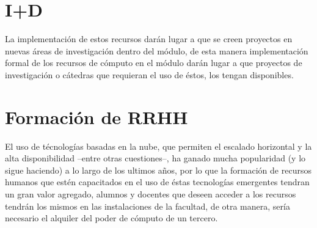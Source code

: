 \documentclass{article}
\begin{document}
\section{I+D}%
\label{sec:i_d}
La implementación de estos recursos darán lugar a que se creen proyectos en nuevas áreas de investigación
dentro del módulo, de esta manera implementación formal de los recursos de cómputo en el módulo darán lugar
a que proyectos de investigación o cátedras que requieran el uso de éstos,
los tengan disponibles.




\section{Formación de RRHH}%
\label{sec:formacion_de_rrhh}
El uso de técnologías basadas en la nube, que permiten el escalado horizontal y
la alta disponibilidad --entre otras cuestiones--, ha ganado mucha popularidad
(y lo sigue haciendo\cite{harper2019}) a lo largo de los ultimos años\cite{m-23},
por lo que la formación de recursos humanos que estén capacitados en el uso de
éstas tecnologías emergentes tendran un gran valor agregado, alumnos y docentes
que deseen acceder a los recursos tendrán los mismos en las instalaciones de la
facultad, de otra manera, sería necesario el alquiler del poder de cómputo de
un tercero\cite{aws, gce, ibm-cloud}.



\newpage

\printbibliography[keyword={web-oficial},title={Referencias: Sitios Oficiales}]
\printbibliography[keyword={articulo}, title={Referencias: Artículos}]
\end{document}
